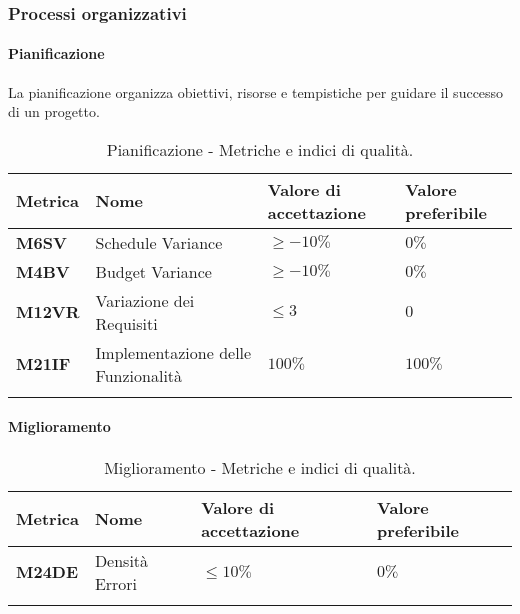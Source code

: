 \subsubsection{Processi organizzativi}

\paragraph{Pianificazione}
La pianificazione organizza obiettivi, risorse e tempistiche per guidare il successo di un progetto.

\hspace{1pt}
    \begin{longtable}{|C{1.5cm}|L{3cm}|L{2.5cm}|L{2.5cm}|}
        \hline
        \textbf{Metrica} & \textbf{Nome} & \textbf{Valore di accettazione} & \textbf{Valore preferibile} \\
        \hline
        \textbf{M6SV} & Schedule Variance & $\geq -10\%$ & $0\%$ \\
        \hline
        \textbf{M4BV} & Budget Variance & $\geq -10\%$ & $0\%$ \\
        \hline
        \textbf{M12VR} & Variazione dei Requisiti & $\leq 3$ & $0$ \\
        \hline
        \textbf{M21IF} & Implementazione delle Funzionalità & $ 100\%$ & $ 100\%$ \\
        \hline
    \caption{Pianificazione - Metriche e indici di qualità.}
    \label{tab:metriche_pianificazione}
\end{longtable}

\paragraph{Miglioramento}
\hspace{1pt}
    \begin{longtable}{|C{1.5cm}|L{3cm}|L{2.5cm}|L{2.5cm}|}
        \hline
        \textbf{Metrica} & \textbf{Nome} & \textbf{Valore di accettazione} & \textbf{Valore preferibile} \\
        \hline
        \textbf{M24DE} & Densità Errori & $\leq 10\%$ & $ 0\%$ \\
        \hline
    \caption{Miglioramento - Metriche e indici di qualità.}
    \label{tab:metriche_miglioramento}
\end{longtable}